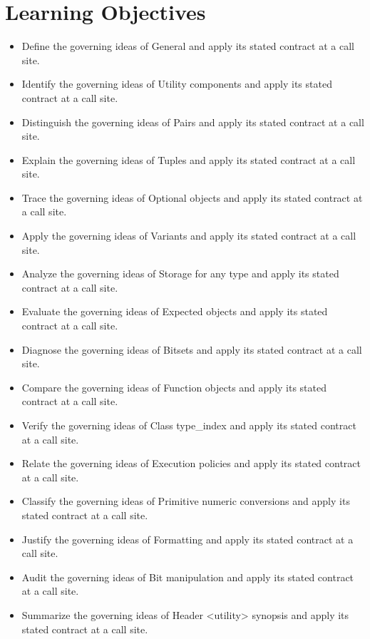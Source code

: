 \documentclass[11pt,letterpaper]{article}
\begin{document}
\section{Learning Objectives}
\begin{itemize}[label=\textcolor{CornellReferenceTeal}{$\blacktriangleright$}]
\item Define the governing ideas of General and apply its stated contract at a call site.
\item Identify the governing ideas of Utility components and apply its stated contract at a call site.
\item Distinguish the governing ideas of Pairs and apply its stated contract at a call site.
\item Explain the governing ideas of Tuples and apply its stated contract at a call site.
\item Trace the governing ideas of Optional objects and apply its stated contract at a call site.
\item Apply the governing ideas of Variants and apply its stated contract at a call site.
\item Analyze the governing ideas of Storage for any type and apply its stated contract at a call site.
\item Evaluate the governing ideas of Expected objects and apply its stated contract at a call site.
\item Diagnose the governing ideas of Bitsets and apply its stated contract at a call site.
\item Compare the governing ideas of Function objects and apply its stated contract at a call site.
\item Verify the governing ideas of Class type\_\allowbreak{}index and apply its stated contract at a call site.
\item Relate the governing ideas of Execution policies and apply its stated contract at a call site.
\item Classify the governing ideas of Primitive numeric conversions and apply its stated contract at a call site.
\item Justify the governing ideas of Formatting and apply its stated contract at a call site.
\item Audit the governing ideas of Bit manipulation and apply its stated contract at a call site.
\item Summarize the governing ideas of Header <utility> synopsis and apply its stated contract at a call site.
\end{itemize}
\end{document}
